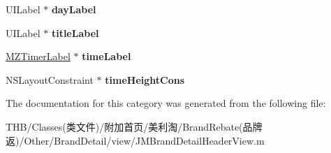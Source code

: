 \begin{DoxyCompactItemize}
U\+I\+Label $\ast$ {\bfseries day\+Label}
\item 
\mbox{\label{category_j_m_brand_detail_header_view_07_08_a4c0a8a8a9ba5f9b6e9b588aa16a2f787}} 
U\+I\+Label $\ast$ {\bfseries title\+Label}
\item 
\mbox{\label{category_j_m_brand_detail_header_view_07_08_a0b6d26cbd1530c7e47bee2f826d88479}} 
\mbox{\hyperlink{interface_m_z_timer_label}{M\+Z\+Timer\+Label}} $\ast$ {\bfseries time\+Label}
\item 
\mbox{\label{category_j_m_brand_detail_header_view_07_08_ae77a23219fa1b95beb2d93d0c7aca66c}} 
N\+S\+Layout\+Constraint $\ast$ {\bfseries time\+Height\+Cons}
\end{DoxyCompactItemize}


The documentation for this category was generated from the following file\+:\begin{DoxyCompactItemize}
\item 
T\+H\+B/\+Classes(类文件)/附加首页/美利淘/\+Brand\+Rebate(品牌返)/\+Other/\+Brand\+Detail/view/J\+M\+Brand\+Detail\+Header\+View.\+m\end{DoxyCompactItemize}
